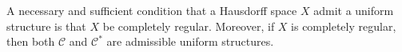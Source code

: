 A necessary and sufficient condition that a Hausdorff space $X$ admit a uniform structure is that $X$ be completely regular. Moreover, if $X$ is completely regular, then both $\mathcal{C}$ and $\mathcal{C}^*$ are admissible uniform structures.
